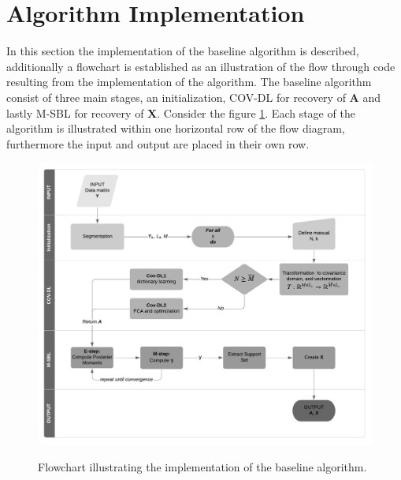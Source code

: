 \section{Algorithm Implementation}
In this section the implementation of the baseline algorithm is described, additionally a flowchart is established as an illustration of the flow through code resulting from the implementation of the algorithm. 
The baseline algorithm consist of three main stages, an initialization, COV-DL for recovery of $\textbf{A}$ and lastly M-SBL for recovery of $\textbf{X}$. 
Consider the figure \ref{fig:flow}. 
Each stage of the algorithm is illustrated within one horizontal row of the flow diagram, furthermore the input and output are placed in their own row.    

\begin{figure}[H]
\centering
\includegraphics[scale=0.8]{figures/ch_6/baseline_flowchart.png}
\label{fig:flow}
\caption{Flowchart illustrating the implementation of the baseline algorithm.}
\end{figure}
\noindent
{}

